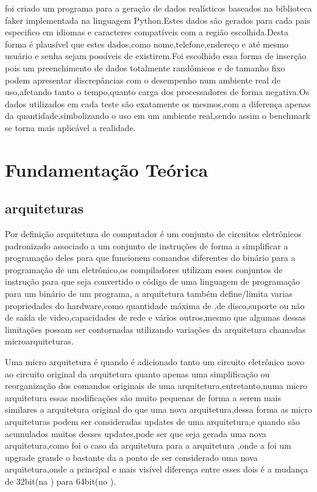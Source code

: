 \documentclass[
	12pt,				%
	openright,			%
	oneside,			%
	a4paper,			%
	english,			%
	french,				%
	spanish,			%
	brazil,				%
	]{abntex2}
\begin{document}
foi criado um programa para a geração de dados realísticos baseados na biblioteca faker implementada na linguagem Python.Estes dados são gerados para cada pais especifico em idiomas e caracteres compatíveis com a região escolhida.Desta forma é plausível que estes dados,como nome,telefone,endereço e até mesmo usuário e senha sejam possíveis de existirem.Foi escolhido essa forma de inserção pois um preenchimento de dados totalmente randômicos e de tamanho fixo podem apresentar discrepâncias com o desempenho num ambiente real de uso,afetando tanto o tempo,quanto carga dos processadores de forma negativa.Os dados utilizados em cada teste são exatamente os mesmos,com a diferença apenas da quantidade,simbolizando o uso em um ambiente real,sendo assim o benchmark se torna mais aplicável a realidade.\newline

\chapter{Fundamentação Teórica}
\label{ch:fundamentacao teorica}

\section{arquiteturas}
\label{sec: arquiteturas}
Por definição arquitetura de computador é um conjunto de circuitos eletrônicos padronizado associado a um conjunto de instruções de forma a simplificar a programação deles para que funcionem comandos diferentes do binário para a programação de um eletrônico,os compiladores utilizam esses conjuntos de instrução para que seja convertido o código de uma linguagem de programação para um binário de um programa, a arquitetura também define/limita varias propriedades do hardware,como quantidade máxima de ,de disco,suporte ou não de saída de video,capacidades de rede e vários outros,mesmo que algumas dessas limitações possam ser contornadas utilizando variações da arquitetura chamadas microarquiteturas.\newline

Uma micro arquitetura é quando é adicionado tanto um circuito eletrônico novo ao circuito original da arquitetura quanto apenas uma simplificação ou reorganização dos comandos originais de uma arquitetura,entretanto,numa micro arquitetura essas modificações são muito pequenas de forma a serem mais similares a arquitetura original do que uma nova arquitetura,dessa forma as micro arquiteturas podem ser consideradas updates de uma arquitetura,e quando são acumulados muitos desses updates,pode ser que seja gerada uma nova arquitetura,como foi o caso da arquitetura  para a arquitetura ,onde a  foi um upgrade grande o bastante da  a ponto de ser considerado uma nova arquitetura,onde a principal e mais visível diferença entre esses dois é a mudança de 32bit(na ) para 64bit(no ).\newline
\end{document}

